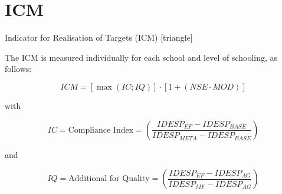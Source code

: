 \documentclass{beamer}
\begin{document}
\section{ICM}


\begin{frame}[label=ICM]{Indicator for Realisation of Targets (ICM)}
\vspace{-27pt} \flushright \hyperlink{Mirror}{\beamerbutton{\textcolor{red}{Mirror}}}
\vspace{10pt}
[triangle]
\begin{itemize} 
{\scriptsize\item The ICM is measured individually for each school and level of schooling, as follows:}
\end{itemize}

\vspace{-15pt}
\begin{equation} \label{eq:ICM}
ICM = \left[\max{(IC;IQ)} \right] \cdot \left[1 +(NSE \cdot MOD) \right]
\end{equation}

\vspace{-15pt}
\begin{flushleft} \hspace{9pt}
{\scriptsize with}
\end{flushleft}

\vspace{-20pt}
\begin{equation} \label{eq:IC}
IC = \text{Compliance Index} = \left( \frac{IDESP_{EF} - IDESP_{BASE}}{IDESP_{META} - IDESP_{BASE}} \right)
\end{equation}

\vspace{-10pt}
\begin{flushleft} \hspace{9pt}
{\scriptsize and}
\end{flushleft}

\vspace{-20pt}
\begin{equation} \label{eq:AQ}
IQ = \text{Additional for Quality} = \left( \frac{IDESP_{EF} - IDESP_{AG}}{IDESP_{MF} - IDESP_{AG}} \right)
\end{equation}


\end{frame}
\end{document}
